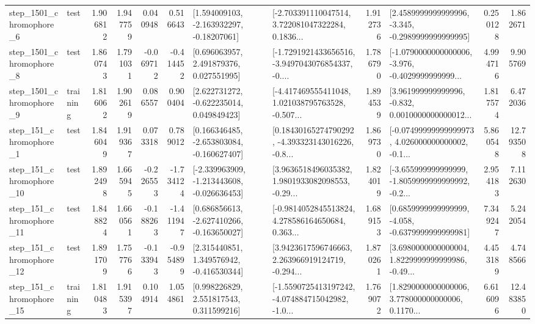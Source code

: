 \begin{tabular}{llrrrrllrlrr}
  step\_1501\_chromophore\_6 &      test &      1.906812 &    1.947759 &      0.040948 &  0.516643 &    [1.594009103, -2.163932297, -0.18207061] &  [-2.703391110047514, 3.722081047322284, 0.1836... &       1.912736 &  [2.4589999999999996, -3.345, -0.2989999999999995] &            0.250128 &          1.862671 \\
  step\_1501\_chromophore\_8 &      test &      1.860743 &    1.791031 &     -0.069712 & -0.414452 &     [0.696063957, 2.491879376, 0.027551995] &  [-1.7291921433656516, -3.9497043076854337, -0.... &       1.786790 &  [-1.0790000000000006, -3.976, -0.4029999999999... &            4.994716 &          9.905769 \\
  step\_1501\_chromophore\_9 &  training &      1.816062 &    1.902619 &      0.086557 &  0.900404 &    [2.622731272, -0.622235014, 0.049849423] &  [-4.417469555411048, 1.021038795763528, -0.507... &       1.894539 &  [3.961999999999996, -0.832, 0.0010000000000012... &            1.817574 &          6.472036 \\
   step\_151\_chromophore\_1 &      test &      1.846049 &    1.919367 &      0.073318 &  0.789012 &   [0.166346485, -2.653803084, -0.160627407] &  [0.18430165274790292, -4.393323143016226, -0.8... &       1.869730 &  [-0.07499999999999973, 4.026000000000002, -0.1... &            5.860548 &         12.793508 \\
  step\_151\_chromophore\_10 &      test &      1.892498 &    1.665945 &     -0.226553 & -1.734124 &  [-2.339963909, -1.213443608, -0.026636453] &  [3.9636518496035382, 1.9801933082098553, -0.29... &       1.824019 &  [-3.655999999999999, -1.8059999999999992, -0.2... &            2.954183 &          7.112630 \\
  step\_151\_chromophore\_11 &      test &      1.848824 &    1.660561 &     -0.188263 & -1.411947 &   [0.686856613, -2.627410266, -0.163650027] &  [-0.9814052845513824, 4.278586164650684, 0.363... &       1.689153 &  [0.6859999999999999, -4.058, -0.6379999999999981] &            7.349247 &          5.242054 \\
  step\_151\_chromophore\_12 &      test &      1.891709 &    1.757766 &     -0.133943 & -0.954899 &    [2.315440851, 1.349576942, -0.416530344] &  [3.9423617596746663, 2.263966919124719, -0.294... &       1.870261 &  [3.6980000000000004, 1.8229999999999986, -0.49... &            4.453189 &          4.748566 \\
  step\_151\_chromophore\_15 &  training &      1.810483 &    1.915397 &      0.104914 &  1.054861 &     [0.998226829, 2.551817543, 0.311599216] &  [-1.5590725413197242, -4.074884715042982, -1.0... &       1.769072 &  [1.8290000000000006, 3.778000000000006, 0.1170... &            6.616096 &         12.483850 \\

\end{tabular}
